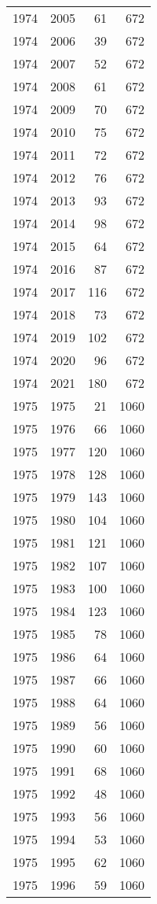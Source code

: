 \documentclass[
  10pt,
  letterpaper,
  DIV=11,
  numbers=noendperiod,
  twoside]{scrartcl}
\begin{document}
\begin{longtable}[]{@{}rrrr@{}}
1974 & 2005 & 61 & 672 \\
1974 & 2006 & 39 & 672 \\
1974 & 2007 & 52 & 672 \\
1974 & 2008 & 61 & 672 \\
1974 & 2009 & 70 & 672 \\
1974 & 2010 & 75 & 672 \\
1974 & 2011 & 72 & 672 \\
1974 & 2012 & 76 & 672 \\
1974 & 2013 & 93 & 672 \\
1974 & 2014 & 98 & 672 \\
1974 & 2015 & 64 & 672 \\
1974 & 2016 & 87 & 672 \\
1974 & 2017 & 116 & 672 \\
1974 & 2018 & 73 & 672 \\
1974 & 2019 & 102 & 672 \\
1974 & 2020 & 96 & 672 \\
1974 & 2021 & 180 & 672 \\
1975 & 1975 & 21 & 1060 \\
1975 & 1976 & 66 & 1060 \\
1975 & 1977 & 120 & 1060 \\
1975 & 1978 & 128 & 1060 \\
1975 & 1979 & 143 & 1060 \\
1975 & 1980 & 104 & 1060 \\
1975 & 1981 & 121 & 1060 \\
1975 & 1982 & 107 & 1060 \\
1975 & 1983 & 100 & 1060 \\
1975 & 1984 & 123 & 1060 \\
1975 & 1985 & 78 & 1060 \\
1975 & 1986 & 64 & 1060 \\
1975 & 1987 & 66 & 1060 \\
1975 & 1988 & 64 & 1060 \\
1975 & 1989 & 56 & 1060 \\
1975 & 1990 & 60 & 1060 \\
1975 & 1991 & 68 & 1060 \\
1975 & 1992 & 48 & 1060 \\
1975 & 1993 & 56 & 1060 \\
1975 & 1994 & 53 & 1060 \\
1975 & 1995 & 62 & 1060 \\
1975 & 1996 & 59 & 1060 \\

\end{longtable}
\end{document}
